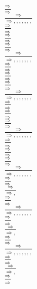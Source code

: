 \documentclass[11pt]{article}
\begin{document}
\begin{center}
\bigskip
\\$\frac{\Rightarrow }{\Rightarrow }$
\bigskip
\\$\frac{\Rightarrow }{\Rightarrow , , , , , , , }$
\bigskip
\\$\frac{\Rightarrow }{\Rightarrow }$
\bigskip
\\$\frac{\Rightarrow }{\Rightarrow }$
\bigskip
\\$\frac{\Rightarrow }{\Rightarrow }$
\bigskip
\\$\frac{\Rightarrow }{\Rightarrow , , , , , , , }$
\bigskip
\\$\frac{\Rightarrow }{\Rightarrow }$
\bigskip
\\$\frac{\Rightarrow }{\Rightarrow }$
\bigskip
\\$\frac{\Rightarrow }{\Rightarrow }$
\bigskip
\\$\frac{\Rightarrow }{\Rightarrow , , , , , , , }$
\bigskip
\\$\frac{\Rightarrow }{\Rightarrow }$
\bigskip
\\$\frac{\Rightarrow }{\Rightarrow }$
\bigskip
\\$\frac{\Rightarrow }{\Rightarrow }$
\bigskip
\\$\frac{\Rightarrow }{\Rightarrow , , , , , , , }$
\bigskip
\\$\frac{\Rightarrow }{\Rightarrow }$
\bigskip
\\$\frac{\Rightarrow }{\Rightarrow }$
\bigskip
\\$\frac{\Rightarrow }{\Rightarrow }$
\bigskip
\\$\frac{\Rightarrow }{\Rightarrow , , , , , , , }$
\bigskip
\\$\frac{\Rightarrow }{\Rightarrow }$
\bigskip
\\$\frac{\Rightarrow }{\Rightarrow , }$
\bigskip
\\$\frac{\Rightarrow }{\Rightarrow }$
\bigskip
\\$\frac{\Rightarrow }{\Rightarrow , , , , , , , }$
\bigskip
\\$\frac{\Rightarrow }{\Rightarrow }$
\bigskip
\\$\frac{\Rightarrow }{\Rightarrow , }$
\bigskip
\\$\frac{\Rightarrow }{\Rightarrow }$
\bigskip
\\$\frac{\Rightarrow }{\Rightarrow , , , , , , , }$
\bigskip
\\$\frac{\Rightarrow }{\Rightarrow }$
\bigskip
\\$\frac{\Rightarrow }{\Rightarrow , }$
\bigskip
\\$\frac{\Rightarrow }{\Rightarrow }$

\end{center}
\end{document}
